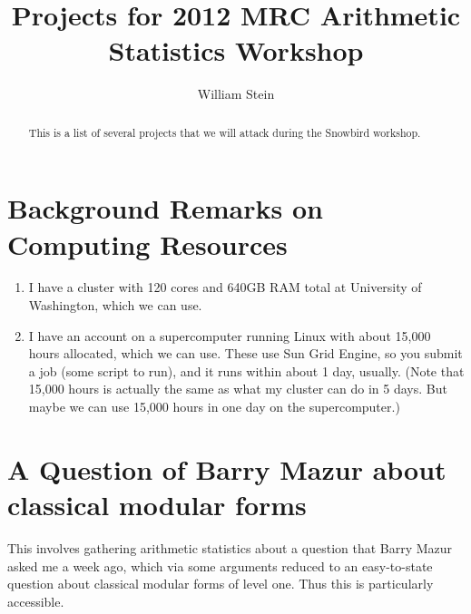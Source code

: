 \documentclass{article}
\title{Projects for 2012 MRC Arithmetic Statistics Workshop}
\author{William Stein}
\begin{document}
\maketitle
\begin{abstract}
This is a list of several projects that we will attack during the
Snowbird workshop.
\end{abstract}

\tableofcontents

\section*{Background Remarks on Computing Resources}

\begin{enumerate}
\item I have a cluster with 120 cores and 640GB RAM total at
  University of Washington, which we can use.  

\item I have an account on a supercomputer running Linux with about
  15,000 hours allocated, which we can use.  These use Sun Grid
  Engine, so you submit a job (some script to run), and it runs within
  about 1 day, usually.  (Note that 15,000 hours is actually the same
  as what my cluster can do in 5 days.  But maybe we can use 15,000 hours in one day on the supercomputer.)
\end{enumerate}


\section{A Question of Barry Mazur about classical modular forms}

This involves gathering arithmetic statistics about a question that
Barry Mazur asked me a week ago, which via some arguments reduced to 
an easy-to-state question about classical modular forms of level one.
Thus this is particularly accessible.
\end{document}
